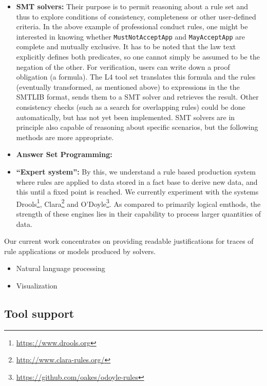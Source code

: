 \documentclass[runningheads]{llncs}
\begin{document}
\begin{itemize}
\item \textbf{SMT solvers:} Their purpose is to permit reasoning about a rule
  set and thus to explore conditions of consistency, completeness or other
  user-defined criteria. In the above example of professional conduct rules,
  one might be interested in knowing whether
  \texttt{MustNotAcceptApp} and \texttt{MayAcceptApp} are complete and
  mutually exclusive. It has to be noted that the law text explicitly defines
  both predicates, so one cannot simply be assumed to be the negation of the
  other. For verification, users can write down a proof obligation (a formula). The L4
  tool set translates this formula and the rules (eventually transformed, as
  mentioned above) to expressions in the the SMTLIB format, sends them to a
  SMT solver and retrieves the result.  Other consistency checks (such as a search for
  overlapping rules) could be done automatically, but has not yet been
  implemented. SMT solvers are in principle also capable of reasoning about
  specific scenarios, but the following methods are more appropriate.
\item \textbf{Answer Set Programming:}
\item \textbf{``Expert system'':} By this, we understand a rule based
  production system where rules are applied to data stored in a fact base to
  derive new data, and this until a fixed point is reached. We currently
  experiment with the systems Drools\footnote{\url{https://www.drools.org}},
  Clara\footnote{\url{http://www.clara-rules.org/}} and
  O'Doyle\footnote{\url{https://github.com/oakes/odoyle-rules}}. As compared
  to primarily logical emthods, the strength
  of these engines lies in their capability to process larger quantities of
  data.
\end{itemize}
Our current work concentrates on providing readable justifications for traces
of rule applications or models produced by solvers.



\begin{itemize}
\item Natural language processing
\item Visualization
\end{itemize}

\subsection{Tool support}\label{sec:tool_support}
\end{document}
